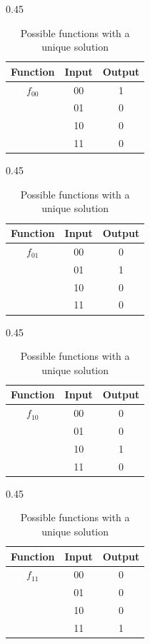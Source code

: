 \begin{example}
    \begin{table}[ht]
    \centering
     \begin{subtable}[b]{0.45\linewidth}
        \centering
          \begin{tabular}{|c|c|c|}
            \hline
             Function & Input & Output \\
            \hline
              $f_{00}$& 00 & 1 \\
              & 01 & 0 \\
              & 10 & 0 \\
              & 11 & 0 \\
             \hline
           \end{tabular}
           \caption{$f_{00}$}
        \end{subtable}%
     \begin{subtable}[b]{0.45\linewidth}
            \centering
            \begin{tabular}{|c|c|c|}
                \hline
                Function & Input & Output \\
                \hline
                $f_{01}$& 00 & 0 \\
                & 01 & 1 \\
                & 10 & 0 \\
                & 11 & 0 \\
                \hline
            \end{tabular}
            \caption{$f_{01}$}
        \end{subtable}
        \begin{subtable}[b]{0.45\linewidth}
            \centering
            \begin{tabular}{|c|c|c|}
                \hline
                Function & Input & Output \\
                \hline
                $f_{10}$& 00 & 0 \\
                & 01 & 0 \\
                & 10 & 1 \\
                & 11 & 0 \\
                \hline
            \end{tabular}
            \caption{$f_{10}$}
        \end{subtable}
        \begin{subtable}[b]{0.45\linewidth}
            \centering
            \begin{tabular}{|c|c|c|}
                \hline
                Function & Input & Output \\
                \hline
                $f_{11}$& 00 & 0 \\
                & 01 & 0 \\
                & 10 & 0 \\
                & 11 & 1 \\
                \hline
            \end{tabular}
            \caption{$f_{11}$}
        \end{subtable}
        \caption{Possible functions with a unique solution}
        \label{tab:deutsch_example}
    \end{table}


\end{example}
